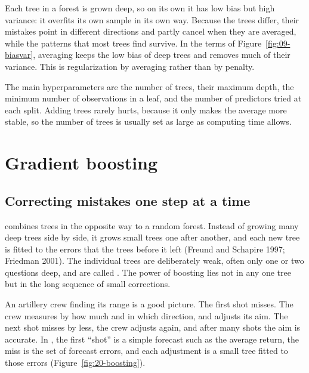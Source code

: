 Each tree in a forest is grown deep, so on its own it has low bias but high variance: it overfits its own sample in its own way. Because the trees differ, their mistakes point in different directions and partly cancel when they are averaged, while the patterns that most trees find survive. In the terms of Figure~\ref{fig:09-biasvar}, averaging keeps the low bias of deep trees and removes much of their variance. This is regularization by averaging rather than by penalty.

The main hyperparameters are the number of trees, their maximum depth, the minimum number of observations in a leaf, and the number of predictors tried at each split. Adding trees rarely hurts, because it only makes the average more stable, so the number of trees is usually set as large as computing time allows.

\section{Gradient boosting}
\label{sec:20-gbm}

\subsection{Correcting mistakes one step at a time}

 combines trees in the opposite way to a random forest. Instead of growing many deep trees side by side, it grows small trees one after another, and each new tree is fitted to the errors that the trees before it left (Freund and Schapire 1997; Friedman 2001). The individual trees are deliberately weak, often only one or two questions deep, and are called . The power of boosting lies not in any one tree but in the long sequence of small corrections.

An artillery crew finding its range is a good picture. The first shot misses. The crew measures by how much and in which direction, and adjusts its aim. The next shot misses by less, the crew adjusts again, and after many shots the aim is accurate. In , the first ``shot'' is a simple forecast such as the average return, the miss is the set of forecast errors, and each adjustment is a small tree fitted to those errors (Figure~\ref{fig:20-boosting}).

